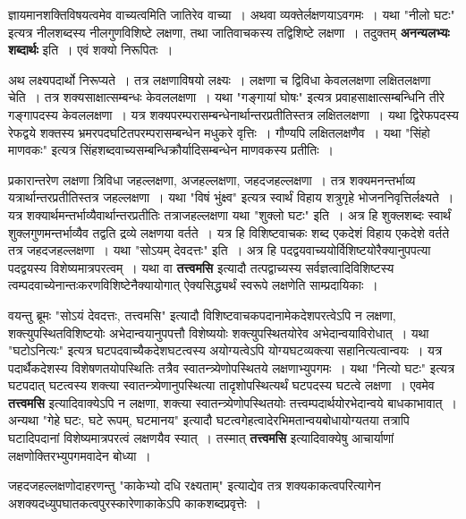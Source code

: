 	ज्ञायमानशक्तिविषयत्वमेव वाच्यत्वमिति जातिरेव वाच्या~। अथवा व्यक्तेर्लक्षणयाऽवगमः~। यथा "नीलो घटः" इत्यत्र नीलशब्दस्य नीलगुणविशिष्टे लक्षणा, तथा जातिवाचकस्य तद्विशिष्टे लक्षणा~। तदुक्तम् {\bfseries अनन्यलभ्यः शब्दार्थः} इति~। एवं शक्यो निरूपितः~।\par
	अथ लक्ष्यपदार्थो निरूप्यते~। तत्र लक्षणाविषयो लक्ष्यः~। लक्षणा च द्विविधा केवललक्षणा लक्षितलक्षणा चेति~। तत्र शक्यसाक्षात्सम्बन्धः केवललक्षणा~। यथा "गङ्गायां घोषः" इत्यत्र प्रवाहसाक्षात्सम्बन्धिनि तीरे गङ्गापदस्य केवललक्षणा~। यत्र शक्यपरम्परासम्बन्धेनार्थान्तरप्रतीतिस्तत्र लक्षितलक्षणा~। यथा द्विरेफपदस्य रेफद्वये शक्तस्य भ्रमरपदघटितपरम्परासम्बन्धेन मधुकरे वृत्तिः~। गौण्यपि लक्षितलक्षणैव~। यथा "सिंहो माणवकः" इत्यत्र सिंहशब्दवाच्यसम्बन्धिक्रौर्यादिसम्बन्धेन माणवकस्य प्रतीतिः~।\par
	प्रकारान्तरेण लक्षणा त्रिविधा जहल्लक्षणा, अजहल्लक्षणा, जहदजहल्लक्षणा~। तत्र शक्यमनन्तर्भाव्य यत्रार्थान्तरप्रतीतिस्तत्र जहल्लक्षणा~। यथा "विषं भुंक्ष्व" इत्यत्र स्वार्थं विहाय शत्रुगृहे भोजननिवृत्तिर्लक्ष्यते~। यत्र शक्यार्थमन्तर्भाव्यैवार्थान्तरप्रतीतिः तत्राजहल्लक्षणा यथा "शुक्लो घटः" इति~। अत्र हि शुक्लशब्दः स्वार्थं शुक्लगुणमन्तर्भाव्यैव तद्वति द्रव्ये लक्षणया वर्तते~। यत्र हि विशिष्टवाचकः शब्द एकदेशं विहाय एकदेशे वर्तते तत्र जहदजहल्लक्षणा~। यथा "सोऽयम् देवदत्तः" इति~। अत्र हि पदद्वयवाच्ययोर्विशिष्टयोरैक्यानुपपत्या पदद्वयस्य विशेष्यमात्रपरत्वम्~। यथा वा {\bfseries तत्त्वमसि} इत्यादौ तत्पद्वाच्यस्य सर्वज्ञत्वादिविशिष्टस्य त्वम्पदवाच्येनान्तःकरणविशिष्टेनैक्यायोगात् ऐक्यसिद्ध्यर्थं स्वरूपे लक्षणेति साम्प्रदायिकाः~।\par
	वयन्तु ब्रूमः "सोऽयं देवदत्तः, तत्त्वमसि" इत्यादौ विशिष्टवाचकपदानामेकदेशपरत्वेऽपि न लक्षणा, शक्त्युपस्थितविशिष्टयोः अभेदान्वयानुपपत्तौ विशेष्ययोः शक्त्युपस्थितयोरेव अभेदान्वयाविरोधात्~। यथा "घटोऽनित्यः" इत्यत्र घटपदवाच्यैकदेशघटत्वस्य अयोग्यत्वेऽपि योग्यघटव्यक्त्या सहानित्यत्वान्वयः~। यत्र पदार्थैकदेशस्य विशेषणतयोपस्थितिः तत्रैव स्वातन्त्र्येणोपस्थितये लक्षणाभ्युपगमः~। यथा "नित्यो घटः" इत्यत्र घटपदात् घटत्वस्य शक्त्या स्वातन्त्र्येणानुपस्थित्या तादृशोपस्थित्यर्थं घटपदस्य घटत्वे लक्षणा~। एवमेव {\bfseries तत्त्वमसि} इत्यादिवाक्येऽपि न लक्षणा, शक्त्या स्वातन्त्र्येणोपस्थितयोः तत्त्वम्पदार्थयोरभेदान्वये बाधकाभावात्~। अन्यथा "गेहे घटः, घटे रूपम्, घटमानय" इत्यादौ घटत्वगेहत्वादेरभिमतान्वयबोधायोग्यतया तत्रापि घटादिपदानां विशेष्यमात्रपरत्वं लक्षणयैव स्यात्~। तस्मात् {\bfseries तत्त्वमसि} इत्यादिवाक्येषु आचार्याणां लक्षणोक्तिरभ्युपगमवादेन बोध्या~।\par
	जहदजहल्लक्षणोदाहरणन्तु "काकेभ्यो दधि रक्ष्यताम्" इत्याद्येव तत्र शक्यकाकत्वपरित्यागेन अशक्यदध्युपघातकत्वपुरस्कारेणाकाकेऽपि काकशब्दप्रवृत्तेः~।\par

